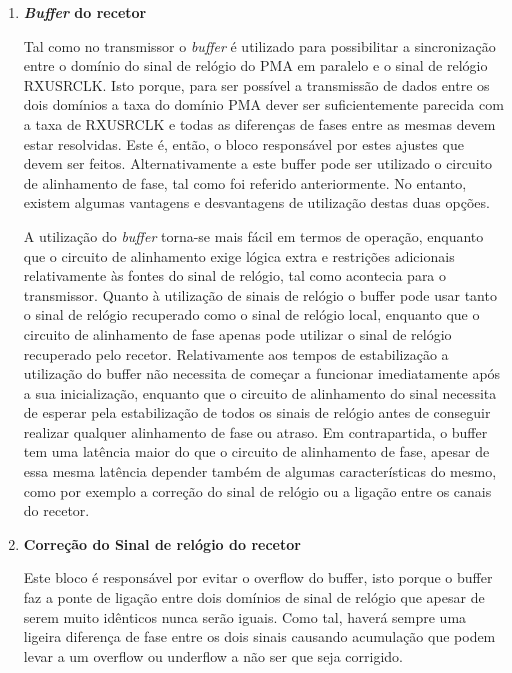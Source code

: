 \begin{enumerate}
	\item \textbf{\textit{Buffer} do recetor}
	
	\hspace{1.0em}Tal como no transmissor o \textit{buffer} é utilizado para possibilitar a sincronização entre o domínio do sinal de relógio do PMA em paralelo e o sinal de relógio RXUSRCLK. Isto porque, para ser possível a transmissão de dados entre os dois domínios a taxa do domínio PMA dever ser suficientemente parecida com a taxa de RXUSRCLK e todas as diferenças de fases entre as mesmas devem estar resolvidas. Este é, então, o bloco responsável por estes ajustes que devem ser feitos. Alternativamente a este buffer pode ser utilizado o circuito de alinhamento de fase, tal como foi referido anteriormente. No entanto, existem algumas vantagens e desvantagens de utilização destas duas opções.
	
	\hspace{1.0em}A utilização do \textit{buffer} torna-se mais fácil em termos de operação, enquanto que o circuito de alinhamento exige lógica extra e restrições adicionais relativamente às fontes do sinal de relógio, tal como acontecia para o transmissor. Quanto à utilização de sinais de relógio o buffer pode usar tanto o sinal de relógio recuperado como o sinal de relógio local, enquanto que o circuito de alinhamento de fase apenas pode utilizar o sinal de relógio recuperado pelo recetor. Relativamente aos tempos de estabilização a utilização do buffer não necessita de começar a funcionar imediatamente após a sua inicialização, enquanto que o circuito de alinhamento do sinal necessita de esperar pela estabilização de todos os sinais de relógio antes de conseguir realizar qualquer alinhamento de fase ou atraso. Em contrapartida, o buffer tem uma latência maior do que o circuito de alinhamento de fase, apesar de essa mesma latência depender também de algumas características do mesmo, como por exemplo a correção do sinal de relógio ou a ligação entre os canais do recetor.
	
	\item \textbf{Correção do Sinal de relógio do recetor }
	
	\hspace{1.0em}Este bloco é responsável por evitar o overflow do buffer, isto porque o buffer faz a ponte de ligação entre dois domínios de sinal de relógio que apesar de serem muito idênticos nunca serão iguais. Como tal, haverá sempre uma ligeira diferença de fase entre os dois sinais causando acumulação que podem levar a um overflow ou underflow a não ser que seja corrigido. 
	

\end{enumerate}
